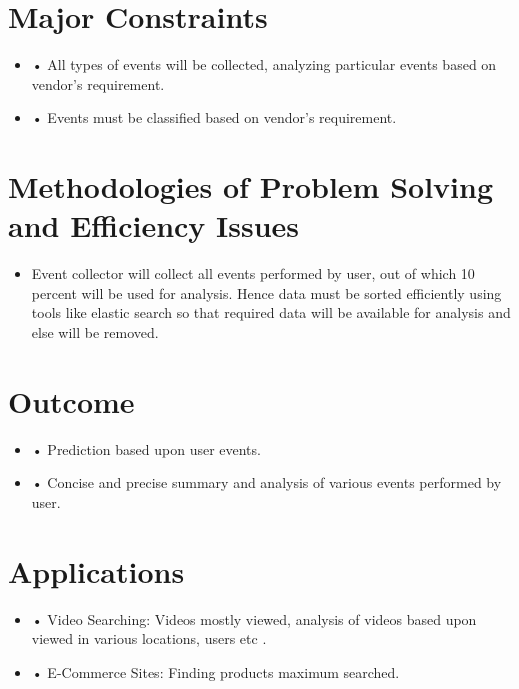 \documentclass[oneside,a4paper,12pt]{book}
\begin{document}
\begin{enumerate}
\begin{itemize}
	\end{itemize}


\section{Major Constraints}
\begin{itemize}
\item •	All types of events will be collected, analyzing particular events based on vendor’s requirement.
\item •	Events must be classified based on vendor’s requirement.
\end{itemize}

\section{Methodologies of Problem Solving and Efficiency Issues}
\begin{itemize}
	\item Event collector will collect all events performed by user, out of which  10 percent will be used for analysis. Hence data must be sorted efficiently using tools like elastic search so that required data will be available for analysis and else will be removed.
	
\end{itemize}



\section{Outcome}
\begin{itemize}
\item •	Prediction based upon user events.
\item •	Concise and precise summary and analysis of various events performed by user.
\end{itemize}

\section{Applications}
\begin{itemize}
\item •	Video Searching: Videos mostly viewed, analysis of videos based upon viewed in various locations, users etc .
\item •	E-Commerce Sites: Finding products maximum searched. 

\end{itemize}


\end{enumerate}
\end{document}

